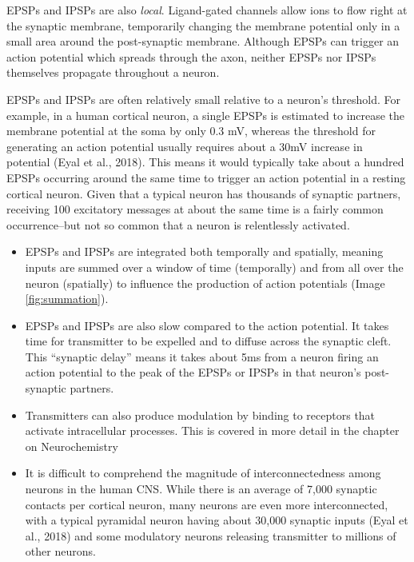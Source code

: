 \documentclass[
]{book}
\providecommand{\tightlist}{%
  \setlength{\itemsep}{0pt}\setlength{\parskip}{0pt}}
\begin{document}
EPSPs and IPSPs are also \emph{local}. Ligand-gated channels allow ions to flow right at the synaptic membrane, temporarily changing the membrane potential only in a small area around the post-synaptic membrane. Although EPSPs can trigger an action potential which spreads through the axon, neither EPSPs nor IPSPs themselves propagate throughout a neuron.

EPSPs and IPSPs are often relatively small relative to a neuron's threshold. For example, in a human cortical neuron, a single EPSPs is estimated to increase the membrane potential at the soma by only 0.3 mV, whereas the threshold for generating an action potential usually requires about a 30mV increase in potential (Eyal et al., 2018). This means it would typically take about a hundred EPSPs occurring around the same time to trigger an action potential in a resting cortical neuron. Given that a typical neuron has thousands of synaptic partners, receiving 100 excitatory messages at about the same time is a fairly common occurrence--but not so common that a neuron is relentlessly activated.

\begin{itemize}
\tightlist
\item
  EPSPs and IPSPs are integrated both temporally and spatially, meaning inputs are summed over a window of time (temporally) and from all over the neuron (spatially) to influence the production of action potentials (Image \ref{fig:summation}).
\item
  EPSPs and IPSPs are also slow compared to the action potential. It takes time for transmitter to be expelled and to diffuse across the synaptic cleft. This ``synaptic delay'' means it takes about 5ms from a neuron firing an action potential to the peak of the EPSPs or IPSPs in that neuron's post-synaptic partners.
\item
  Transmitters can also produce modulation by binding to receptors that activate intracellular processes. This is covered in more detail in the chapter on Neurochemistry
\item
  It is difficult to comprehend the magnitude of interconnectedness among neurons in the human CNS. While there is an average of 7,000 synaptic contacts per cortical neuron, many neurons are even more interconnected, with a typical pyramidal neuron having about 30,000 synaptic inputs (Eyal et al., 2018) and some modulatory neurons releasing transmitter to millions of other neurons.
\end{itemize}
\end{document}
